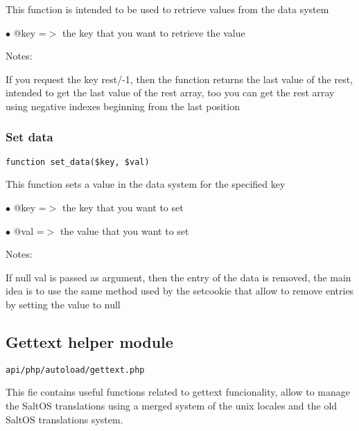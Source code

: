 \documentclass[a4paper]{article}
\begin{document}
This function is intended to be used to retrieve values from the
data system

\begin{compactitem}
\item[\color{myblue}$\bullet$] @key =$>$ the key that you want to retrieve the value
\end{compactitem}

Notes:

If you request the key rest/-1, then the function returns the last
value of the rest, intended to get the last value of the rest array,
too you can get the rest array using negative indexes beginning
from the last position

\hypertarget{toc147}{}
\subsubsection{Set data}

\begin{lstlisting}
function set_data($key, $val)
\end{lstlisting}

This function sets a value in the data system for the specified key

\begin{compactitem}
\item[\color{myblue}$\bullet$] @key =$>$ the key that you want to set
\item[\color{myblue}$\bullet$] @val =$>$ the value that you want to set
\end{compactitem}

Notes:

If null val is passed as argument, then the entry of the data is removed,
the main idea is to use the same method used by the setcookie that allow
to remove entries by setting the value to null

\hypertarget{toc148}{}
\subsection{Gettext helper module}

\begin{lstlisting}
api/php/autoload/gettext.php
\end{lstlisting}

This fie contains useful functions related to gettext funcionality, allow to manage the
SaltOS translations using a merged system of the unix locales and the old SaltOS translations
system.

\hypertarget{toc149}{}
\end{document}
